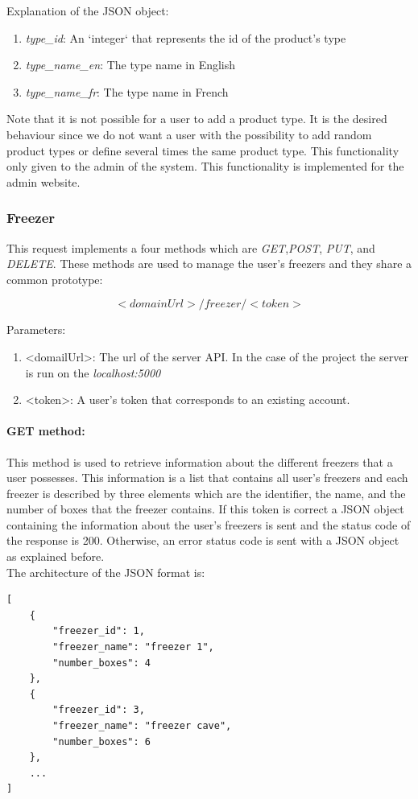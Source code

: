 Explanation of the  JSON object:
\begin{enumerate}
\item \textit{type\_id}: An `integer` that represents the id of the product's type
\item \textit{type\_name\_en}: The type name in English
\item \textit{type\_name\_fr}: The type name in French
\end{enumerate}

Note that it is not possible for a user to add a product type. It is the desired behaviour since we do not want a user with the possibility to add random product types or define several times the same product type. This functionality only given to the admin of the system. This functionality is implemented for the admin website.

\subsubsection{Freezer}
This request implements a four methods which are \textit{GET},\textit{POST}, \textit{PUT}, and \textit{DELETE}. These methods are used to manage the user's freezers and they share a common prototype:

$$<domainUrl>/freezer/<token>$$

Parameters:
\begin{enumerate}
\item <domailUrl>: The url of the server API. In the case of the project the server is run on the \textit{localhost:5000}
\item <token>: A user's token that corresponds to an existing account.
\end{enumerate}

\paragraph{GET method:} This method is used to retrieve information about the different freezers that a user possesses. This information is a list that contains all user's freezers and each freezer is described by three elements which are the identifier, the name, and the number of boxes that the freezer contains. If this token is correct a JSON object containing the information about the user's freezers is sent and the status code of the response is 200. Otherwise, an error status code is sent with a JSON object as explained before.\\

The architecture of the JSON format is:
\begin{lstlisting}
[
    {
        "freezer_id": 1,
        "freezer_name": "freezer 1",
        "number_boxes": 4
    },
    {
        "freezer_id": 3,
        "freezer_name": "freezer cave",
        "number_boxes": 6
    },
    ...
]
\end{lstlisting}


